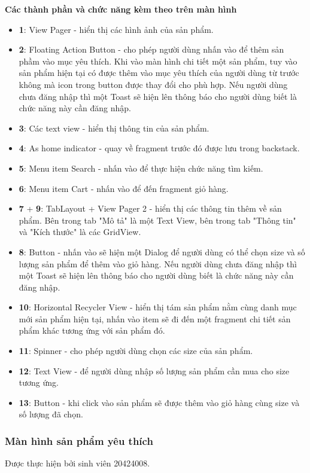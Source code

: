 \documentclass[12pt]{article}
\begin{document}
\indent \textbf{Các thành phần và chức năng kèm theo trên màn hình}
\begin{itemize}
    \item \textbf{1}: View Pager - hiển thị các hình ảnh của sản phẩm.
    \item \textbf{2}: Floating Action Button - cho phép người dùng nhấn vào để thêm sản phầm vào mục yêu thích. Khi vào màn hình chi tiết một sản phẩm, tuy vào sản phẩm hiện tại có được thêm vào mục yêu thích của người dùng từ trước không mà icon trong button được thay đổi cho phù hợp. Nếu người dùng chưa đăng nhập thì một Toast sẽ hiện lên thông báo cho người dùng biết là chức năng này cần đăng nhập.
    \item \textbf{3}: Các text view - hiển thị thông tin của sản phẩm.
    \item \textbf{4}: As home indicator - quay về fragment trước đó được lưu trong backstack.
    \item \textbf{5}: Menu item Search - nhấn vào để thực hiện chức năng tìm kiếm.
    \item \textbf{6}: Menu item Cart - nhấn vào để đến fragment giỏ hàng.
    \item \textbf{7} + \textbf{9}: TabLayout + View Pager 2 - hiển thị các thông tin thêm về sản phẩm. Bên trong tab "Mô tả" là một Text View, bên trong tab "Thông tin" và "Kích thước" là các GridView.
    \item \textbf{8}: Button - nhấn vào sẽ hiện một Dialog để người dùng có thể chọn size và số lượng sản phẩm để thêm vào giỏ hàng. Nếu người dùng chưa đăng nhập thì một Toast sẽ hiện lên thông báo cho người dùng biết là chức năng này cần đăng nhập.
    \item \textbf{10}: Horizontal Recycler View - hiển thị tám sản phẩm nằm cùng danh mục mới sản phẩm hiện tại, nhấn vào item sẽ đi đến một fragment chi tiết sản phẩm khác tương ứng với sản phẩm đó.
    \item \textbf{11}: Spinner - cho phép người dùng chọn các size của sản phẩm.
    \item \textbf{12}: Text View - để người dùng nhập số lượng sản phẩm cần mua cho size tương ứng.
    \item \textbf{13}: Button - khi click vào sản phẩm sẽ được thêm vào giỏ hàng cùng size và số lượng đã chọn.
\end{itemize}

\subsubsection{Màn hình sản phẩm yêu thích}
Được thực hiện bởi sinh viên 20424008.\\
\end{document}
